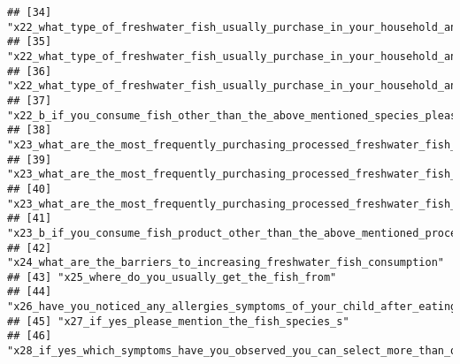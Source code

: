 \documentclass[
]{article}
\begin{document}
\begin{verbatim}
## [34] "x22_what_type_of_freshwater_fish_usually_purchase_in_your_household_and_how_much_per_month_karadu_issa"                                      
## [35] "x22_what_type_of_freshwater_fish_usually_purchase_in_your_household_and_how_much_per_month_carp_spp"                                         
## [36] "x22_what_type_of_freshwater_fish_usually_purchase_in_your_household_and_how_much_per_month_other"                                            
## [37] "x22_b_if_you_consume_fish_other_than_the_above_mentioned_species_please_mention_it_here"                                                     
## [38] "x23_what_are_the_most_frequently_purchasing_processed_freshwater_fish_products_in_your_household_per_month_dried_fish"                       
## [39] "x23_what_are_the_most_frequently_purchasing_processed_freshwater_fish_products_in_your_household_per_month_smoked_fish"                      
## [40] "x23_what_are_the_most_frequently_purchasing_processed_freshwater_fish_products_in_your_household_per_month_other"                            
## [41] "x23_b_if_you_consume_fish_product_other_than_the_above_mentioned_processed_product_please_mention_it_here"                                   
## [42] "x24_what_are_the_barriers_to_increasing_freshwater_fish_consumption"                                                                         
## [43] "x25_where_do_you_usually_get_the_fish_from"                                                                                                  
## [44] "x26_have_you_noticed_any_allergies_symptoms_of_your_child_after_eating_freshwater_fish"                                                      
## [45] "x27_if_yes_please_mention_the_fish_species_s"                                                                                                
## [46] "x28_if_yes_which_symptoms_have_you_observed_you_can_select_more_than_one_option"
\end{verbatim}
\end{document}
